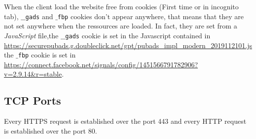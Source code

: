 \documentclass{article}
\begin{document}
When the client load the website free from cookies (First time or in incognito tab), \texttt{$\_\_$gads} and \texttt{$\_$fbp} cookies don't appear anywhere, that means that they are not set anywhere when the ressources are loaded. In fact, they are set from a \textit{JavaScript} file,the \texttt{$\_\_$gads} cookie is set in the Javascript contained in \url{https://securepubads.g.doubleclick.net/gpt/pubads_impl_modern_2019112101.js} the \texttt{$\_$fbp} cookie is set in \url{https://connect.facebook.net/signals/config/1451566791782906?v=2.9.14&r=stable}.

\subsection{TCP Ports}
\label{sub:ports}

Every HTTPS request is established over the port 443 and every HTTP request is established over the port 80.
\end{document}
